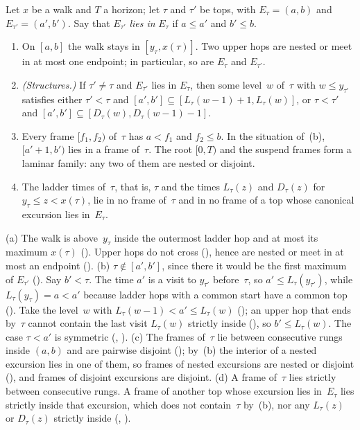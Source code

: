 \begin{lemma}\label{lem:excursions}
Let $x$ be a walk and $T$ a horizon; let $\tau$ and $\tau'$ be tops, with $E_\tau=(a,b)$ and $E_{\tau'}=(a',b')$. Say that
$E_{\tau'}$ \emph{lies in} $E_\tau$ if $a\le a'$ and $b'\le b$.
\begin{enumerate}[label=(\alph*)]
\item On $[a,b]$ the walk stays in $[y_\tau,x(\tau)]$. Two upper hops are nested or meet in at most one endpoint; in
particular, so are $E_\tau$ and $E_{\tau'}$.
\item \emph{(Structures.)} If $\tau'\ne\tau$ and $E_{\tau'}$ lies in $E_\tau$, then some level~$w$ of~$\tau$ with $w\le
y_{\tau'}$ satisfies either $\tau'<\tau$ and $[a',b']\subseteq[L_\tau(w-1)+1,L_\tau(w)]$, or $\tau<\tau'$ and
$[a',b']\subseteq[D_\tau(w),D_\tau(w-1)-1]$.
\item Every frame $[f_1,f_2)$ of~$\tau$ has $a<f_1$ and $f_2\le b$. In the situation of~(b), $[a'+1,b')$ lies in a frame
of~$\tau$. The root $[0,T)$ and the suspend frames form a laminar family: any two of them are nested or disjoint.
\item The ladder times of~$\tau$, that is, $\tau$ and the times $L_\tau(z)$ and $D_\tau(z)$ for $y_\tau\le z<x(\tau)$, lie in no
frame of~$\tau$ and in no frame of a top whose canonical excursion lies in~$E_\tau$.
\end{enumerate}
\end{lemma}

\begin{outline}
(a) The walk is above~$y_\tau$ inside the outermost ladder hop and at most its maximum $x(\tau)$ (). Upper hops
do not cross (), hence are nested or meet in at most an endpoint ().
(b) $\tau\notin[a',b']$, since there it would be the first maximum of $E_{\tau'}$ (). Say $b'<\tau$. The
time $a'$ is a visit to $y_{\tau'}$ before~$\tau$, so $a'\le L_\tau(y_{\tau'})$, while $L_\tau(y_\tau)=a<a'$ because ladder hops
with a common start have a common top (). Take the level~$w$ with $L_\tau(w-1)<a'\le L_\tau(w)$
(); an upper hop that ends by~$\tau$ cannot contain the last visit $L_\tau(w)$ strictly inside
(), so $b'\le L_\tau(w)$. The case $\tau<a'$ is symmetric (, ).
(c) The frames of~$\tau$ lie between consecutive rungs inside $(a,b)$ and are pairwise disjoint (); by~(b)
the interior of a nested excursion lies in one of them, so frames of nested excursions are nested or disjoint
(), and frames of disjoint excursions are disjoint. (d) A frame of~$\tau$ lies strictly between
consecutive rungs. A frame of another top whose excursion lies in~$E_\tau$ lies strictly inside that excursion, which does not
contain~$\tau$ by~(b), nor any $L_\tau(z)$ or $D_\tau(z)$ strictly inside (, ).
\end{outline}

